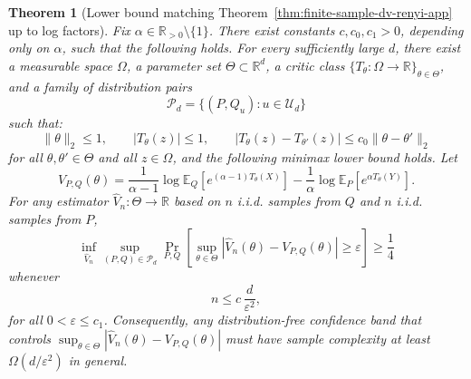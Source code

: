 \documentclass{article}
\theoremstyle{plain}
\newtheorem{theorem}{Theorem}[section]
\theoremstyle{definition}
\theoremstyle{remark}
\begin{document}
\begin{theorem}[Lower bound matching Theorem~\ref{thm:finite-sample-dv-renyi-app} up to log factors]
\label{thm:dv-renyi-lower-bound-app}
Fix \(\alpha\in\mathbb R_{>0}\setminus\{1\}\). There exist constants
\(c,c_0,c_1>0\), depending only on \(\alpha\), such that the following holds.
For every sufficiently large \(d\), there exist a measurable space \(\Omega\), a
parameter set \(\Theta\subset\mathbb R^d\), a critic class
\(\{T_\theta:\Omega\to\mathbb R\}_{\theta\in\Theta}\), and a family of
distribution pairs
\[
    \mathcal P_d=\{(P,Q_u):u\in\mathcal U_d\}
\]
such that:
\[
    \|\theta\|_2\le 1,\qquad
    |T_\theta(z)|\le 1,\qquad
    |T_\theta(z)-T_{\theta'}(z)|\le c_0\|\theta-\theta'\|_2
\]
for all \(\theta,\theta'\in\Theta\) and all \(z\in\Omega\), and the following
minimax lower bound holds. Let
\[
    V_{P,Q}(\theta)
    =
    \frac{1}{\alpha-1}
    \log \mathbb E_Q\!\left[e^{(\alpha-1)T_\theta(X)}\right]
    -
    \frac{1}{\alpha}
    \log \mathbb E_P\!\left[e^{\alpha T_\theta(Y)}\right].
\]
For any estimator \(\widehat V_n:\Theta\to\mathbb R\) based on \(n\) i.i.d.
samples from \(Q\) and \(n\) i.i.d. samples from \(P\),
\[
    \inf_{\widehat V_n}
    \sup_{(P,Q)\in\mathcal P_d}
    \Pr_{P,Q}\!\left[
        \sup_{\theta\in\Theta}
        \left|\widehat V_n(\theta)-V_{P,Q}(\theta)\right|
        \ge \varepsilon
    \right]
    \ge \frac14
\]
whenever
\[
    n \le c\,\frac{d}{\varepsilon^2},
\]
for all \(0<\varepsilon\le c_1\). Consequently, any distribution-free
confidence band that controls
\(\sup_{\theta\in\Theta}|\widehat V_n(\theta)-V_{P,Q}(\theta)|\) must have
sample complexity at least \(\Omega(d/\varepsilon^2)\) in general.
\end{theorem}
\end{document}
